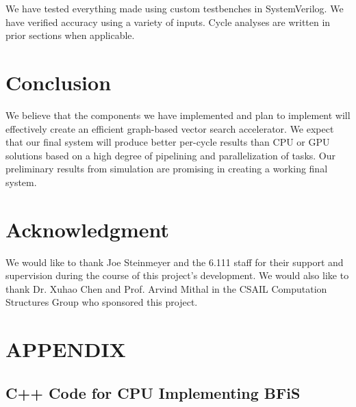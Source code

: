 \documentclass[conference]{IEEEtran}
\begin{document}
We have tested everything made using custom testbenches in SystemVerilog. We have verified accuracy using a variety of inputs. Cycle analyses are written in prior sections when applicable.


\section{Conclusion}

We believe that the components we have implemented and plan to implement will effectively create an efficient graph-based vector search accelerator. We expect that our final system will produce better per-cycle results than CPU or GPU solutions based on a high degree of pipelining and parallelization of tasks. Our preliminary results from simulation are promising in creating a working final system. 


\section*{Acknowledgment}

We would like to thank Joe Steinmeyer and the 6.111 staff for their support and supervision during the course of this project's development. We would also like to thank Dr. Xuhao Chen and Prof. Arvind Mithal in the CSAIL Computation Structures Group who sponsored this project.




\onecolumn\section{APPENDIX}




\subsection{C++ Code for CPU Implementing BFiS}\label{sssec:cpucode}
\end{document}
